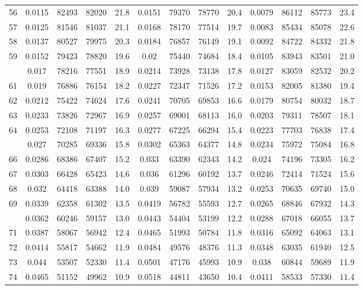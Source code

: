 \documentclass[
  14pt,
]{article}
\begin{document}
\begin{longtable}[t]{lcccccccccccc}
56 & 0.0115 & 82493 & 82020 & 21.8 & 0.0151 & 79370 & 78770 & 20.4 & 0.0079 & 86112 & 85773 & 23.4\\
57 & 0.0125 & 81546 & 81037 & 21.1 & 0.0168 & 78170 & 77514 & 19.7 & 0.0083 & 85434 & 85078 & 22.6\\
58 & 0.0137 & 80527 & 79975 & 20.3 & 0.0184 & 76857 & 76149 & 19.1 & 0.0092 & 84722 & 84332 & 21.8\\
59 & 0.0152 & 79423 & 78820 & 19.6 & 0.02 & 75440 & 74684 & 18.4 & 0.0105 & 83943 & 83501 & 21.0\\
\addlinespace
60 & 0.017 & 78216 & 77551 & 18.9 & 0.0214 & 73928 & 73138 & 17.8 & 0.0127 & 83059 & 82532 & 20.2\\
61 & 0.019 & 76886 & 76154 & 18.2 & 0.0227 & 72347 & 71526 & 17.2 & 0.0153 & 82005 & 81380 & 19.4\\
62 & 0.0212 & 75422 & 74624 & 17.6 & 0.0241 & 70705 & 69853 & 16.6 & 0.0179 & 80754 & 80032 & 18.7\\
63 & 0.0233 & 73826 & 72967 & 16.9 & 0.0257 & 69001 & 68113 & 16.0 & 0.0203 & 79311 & 78507 & 18.1\\
64 & 0.0253 & 72108 & 71197 & 16.3 & 0.0277 & 67225 & 66294 & 15.4 & 0.0223 & 77703 & 76838 & 17.4\\
\addlinespace
65 & 0.027 & 70285 & 69336 & 15.8 & 0.0302 & 65363 & 64377 & 14.8 & 0.0234 & 75972 & 75084 & 16.8\\
66 & 0.0286 & 68386 & 67407 & 15.2 & 0.033 & 63390 & 62343 & 14.2 & 0.024 & 74196 & 73305 & 16.2\\
67 & 0.0303 & 66428 & 65423 & 14.6 & 0.036 & 61296 & 60192 & 13.7 & 0.0246 & 72414 & 71524 & 15.6\\
68 & 0.032 & 64418 & 63388 & 14.0 & 0.039 & 59087 & 57934 & 13.2 & 0.0253 & 70635 & 69740 & 15.0\\
69 & 0.0339 & 62358 & 61302 & 13.5 & 0.0419 & 56782 & 55593 & 12.7 & 0.0265 & 68846 & 67932 & 14.3\\
\addlinespace
70 & 0.0362 & 60246 & 59157 & 13.0 & 0.0443 & 54404 & 53199 & 12.2 & 0.0288 & 67018 & 66055 & 13.7\\
71 & 0.0387 & 58067 & 56942 & 12.4 & 0.0465 & 51993 & 50784 & 11.8 & 0.0316 & 65092 & 64063 & 13.1\\
72 & 0.0414 & 55817 & 54662 & 11.9 & 0.0484 & 49576 & 48376 & 11.3 & 0.0348 & 63035 & 61940 & 12.5\\
73 & 0.044 & 53507 & 52330 & 11.4 & 0.0501 & 47176 & 45993 & 10.9 & 0.038 & 60844 & 59689 & 11.9\\
74 & 0.0465 & 51152 & 49962 & 10.9 & 0.0518 & 44811 & 43650 & 10.4 & 0.0411 & 58533 & 57330 & 11.4\\

\end{longtable}
\end{document}

